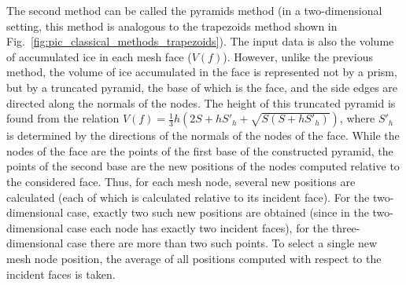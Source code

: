 \documentclass[
11pt,%
tightenlines,%
twoside,%
onecolumn,%
nofloats,%
nobibnotes,%
nofootinbib,%
superscriptaddress,%
noshowpacs,%
centertags]%
{revtex4-2}
\begin{document}
The second method can be called the pyramids method (in a two-dimensional setting, this method is analogous to the trapezoids method shown in Fig.~\ref{fig:pic_classical_methods_trapezoids}).
The input data is also the volume of accumulated ice in each mesh face ($V(f)$).
However, unlike the previous method, the volume of ice accumulated in the face is represented not by a prism, but by a truncated pyramid, the base of which is the face, and the side edges are directed along the normals of the nodes.
The height of this truncated pyramid is found from the relation $V(f) = \frac{1}{3} h (2S + hS'_h + \sqrt{S(S + hS'_h)})$, where $S'_h$ is determined by the directions of the normals of the nodes of the face.
While the nodes of the face are the points of the first base of the constructed pyramid, the points of the second base are the new positions of the nodes computed relative to the considered face.
Thus, for each mesh node, several new positions are calculated (each of which is calculated relative to its incident face).
For the two-dimensional case, exactly two such new positions are obtained (since in the two-dimensional case each node has exactly two incident faces), for the three-dimensional case there are more than two such points.
To select a single new mesh node position, the average of all positions computed with respect to the incident faces is taken.
\end{document}

